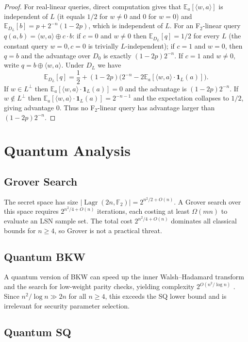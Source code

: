 \documentclass[11pt,a4paper]{article}
\theoremstyle{plain}
\theoremstyle{definition}
\newcommand{\F}{\mathbb{F}}
\newcommand{\E}{\mathbb{E}}
\DeclareMathOperator{\Lagr}{Lagr}
\begin{document}
\begin{proof}
For real-linear queries, direct computation gives that $\E_a[\langle w,a\rangle]$ is independent of $L$ (it equals $1/2$ for $w \neq 0$ and $0$ for $w=0$) and $\E_{D_L}[b]=p+2^{-n}(1-2p)$, which is independent of $L$. For an F$_2$-linear query $q(a,b)=\langle w,a\rangle\oplus c\cdot b$: if $c=0$ and $w\neq 0$ then $\E_{D_L}[q]=1/2$ for every $L$ (the constant query $w=0,c=0$ is trivially $L$-independent); if $c=1$ and $w=0$, then $q=b$ and the advantage over $D_0$ is exactly $(1-2p)2^{-n}$. If $c=1$ and $w\neq 0$, write $q=b\oplus\langle w,a\rangle$. Under $D_L$ we have
\[
\E_{D_L}[q] = \frac12 + (1-2p)\bigl(2^{-n}-2\E_a[\langle w,a\rangle\cdot\mathbf 1_L(a)]\bigr).
\]
If $w\in L^\perp$ then $\E_a[\langle w,a\rangle\cdot\mathbf 1_L(a)]=0$ and the advantage is $(1-2p)2^{-n}$. If $w\notin L^\perp$ then $\E_a[\langle w,a\rangle\cdot\mathbf 1_L(a)]=2^{-n-1}$ and the expectation collapses to $1/2$, giving advantage $0$. Thus no F$_2$-linear query has advantage larger than $(1-2p)2^{-n}$.
\end{proof}


\section{Quantum Analysis}
\label{sec:quantum}

\subsection{Grover Search}
\label{subsec:grover}

The secret space has size $|\Lagr(2n,\F_2)| = 2^{n^2/2 + O(n)}$. A Grover search over this space requires $2^{n^2/4 + O(n)}$ iterations, each costing at least $\Omega(mn)$ to evaluate an LSN sample set. The total cost $2^{n^2/4 + O(n)}$ dominates all classical bounds for $n \geq 4$, so Grover is not a practical threat.

\subsection{Quantum BKW}
\label{subsec:qbkw}

A quantum version of BKW can speed up the inner Walsh--Hadamard transform and the search for low-weight parity checks, yielding complexity $2^{O(n^2 / \log n)}$ \cite{Kir11}. Since $n^2/\log n \gg 2n$ for all $n \geq 4$, this exceeds the SQ lower bound and is irrelevant for security parameter selection.

\subsection{Quantum SQ}
\label{subsec:quantum-sq}
\end{document}
